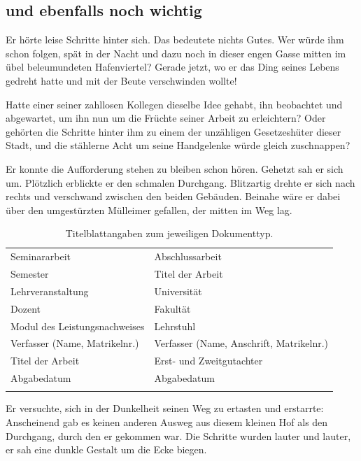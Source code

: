 \documentclass[12pt,ngerman,a4paper,DIV=9,headinclude=true,footinclude=false,titlepage=true,headsepline=true,toc=bibliography,toc=listof]{scrartcl}
\begin{document}
\subsection{und ebenfalls noch
wichtig}\label{und-ebenfalls-noch-wichtig}

Er hörte leise Schritte hinter sich. Das bedeutete nichts Gutes. Wer
würde ihm schon folgen, spät in der Nacht und dazu noch in dieser engen
Gasse mitten im übel beleumundeten Hafenviertel? Gerade jetzt, wo er das
Ding seines Lebens gedreht hatte und mit der Beute verschwinden wollte!

Hatte einer seiner zahllosen Kollegen dieselbe Idee gehabt, ihn
beobachtet und abgewartet, um ihn nun um die Früchte seiner Arbeit zu
erleichtern? Oder gehörten die Schritte hinter ihm zu einem der
unzähligen Gesetzeshüter dieser Stadt, und die stählerne Acht um seine
Handgelenke würde gleich zuschnappen?

Er konnte die Aufforderung stehen zu bleiben schon hören. Gehetzt sah er
sich um. Plötzlich erblickte er den schmalen Durchgang. Blitzartig
drehte er sich nach rechts und verschwand zwischen den beiden Gebäuden.
Beinahe wäre er dabei über den umgestürzten Mülleimer gefallen, der
mitten im Weg lag.

\begin{longtable}[c]{@{}ll@{}}
\caption{Titelblattangaben zum jeweiligen Dokumenttyp.}\\
\toprule\addlinespace
Seminararbeit & Abschlussarbeit
\\\addlinespace
\midrule\endhead
Semester & Titel der Arbeit
\\\addlinespace
Lehrveranstaltung & Universität
\\\addlinespace
Dozent & Fakultät
\\\addlinespace
Modul des Leistungsnachweises & Lehrstuhl
\\\addlinespace
Verfasser (Name, Matrikelnr.) & Verfasser (Name, Anschrift, Matrikelnr.)
\\\addlinespace
Titel der Arbeit & Erst- und Zweitgutachter
\\\addlinespace
Abgabedatum & Abgabedatum
\\\addlinespace
\bottomrule
\end{longtable}

Er versuchte, sich in der Dunkelheit seinen Weg zu ertasten und
erstarrte: Anscheinend gab es keinen anderen Ausweg aus diesem kleinen
Hof als den Durchgang, durch den er gekommen war. Die Schritte wurden
lauter und lauter, er sah eine dunkle Gestalt um die Ecke biegen.
\end{document}
